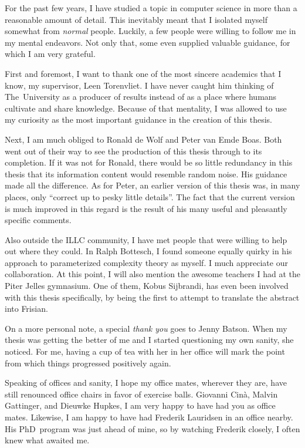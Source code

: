 \acknowledgments
For the past few years, I have studied a topic in computer science in more than a reasonable amount of detail.
This inevitably meant that I isolated myself somewhat from \emph{normal} people.
Luckily, a few people were willing to follow me in my mental endeavors.
Not only that, some even supplied valuable guidance, for which I am very grateful.

First and foremost, I want to thank one of the most sincere academics that I know, my supervisor, Leen Torenvliet.
I have never caught him thinking of The~University as a producer of results instead of as a place where humans cultivate and share knowledge.
Because of that mentality, I was allowed to use my curiosity as the most important guidance in the creation of this thesis.

Next, I am much obliged to Ronald de Wolf and Peter van Emde Boas.
Both went out of their way to see the production of this thesis through to its completion.
If it was not for Ronald, there would be so little redundancy in this thesis that its information content would resemble random noise.
His guidance made all the difference.
As for Peter, an earlier version of this thesis was, in many places, only \enquote{correct up to pesky little details}.
The fact that the current version is much improved in this regard is the result of his many useful and pleasantly specific comments.

Also outside the ILLC community, I have met people that were willing to help out where they could.
In Ralph Bottesch, I found someone equally quirky in his approach to parameterized complexity theory as myself.
I much appreciate our collaboration.
At this point, I will also mention the awesome teachers I had at the Piter Jelles gymnasium.
One of them, Kobus Sijbrandi, has even been involved with this thesis specifically, by being the first to attempt to translate the abstract into Frisian.

On a more personal note, a special \emph{thank you} goes to Jenny Batson.
When my thesis was getting the better of me and I started questioning my own sanity, she noticed.
For me, having a cup of tea with her in her office will mark the point from which things progressed positively again.

Speaking of offices and sanity, I hope my office mates, wherever they are, have still renounced office chairs in favor of exercise balls.
Giovanni Cin{\`a}, Malvin Gattinger, and Dieuwke Hupkes, I am very happy to have had you as office mates.
Likewise, I am happy to have had Frederik Lauridsen in an office nearby.
His PhD~program was just ahead of mine, so by watching Frederik closely, I often knew what awaited me.

